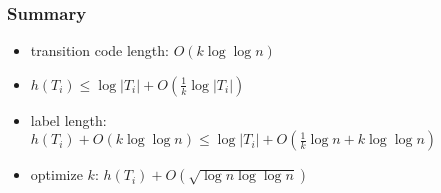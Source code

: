 \documentclass[xcolor=dvipsnames]{beamer}
\begin{document}
\begin{frame}
    \frametitle{Summary}
    \begin{itemize}[<+->]
        \item transition code length: $O(k\log\log n)$
        \item $h(T_i) \le \log|T_i| + O(\tfrac{1}{k}\log|T_i|)$
        \item label length: $h(T_i) + O(k\log\log n)\le \log|T_i| + O(\tfrac{1}{k}\log n + k\log\log n)$
        \item optimize $k$: $h(T_i) + O(\sqrt{\log n\log\log n})$
    \end{itemize}
\end{frame}
\end{document}
